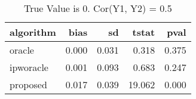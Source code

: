 \begin{table}[h!]

\caption{True Value is 0. Cor(Y1, Y2) = 0.5}
\centering
\begin{tabular}[t]{lrrrr}
\toprule
algorithm & bias & sd & tstat & pval\\
\midrule
oracle & 0.000 & 0.031 & 0.318 & 0.375\\
ipworacle & 0.001 & 0.093 & 0.683 & 0.247\\
proposed & 0.017 & 0.039 & 19.062 & 0.000\\
\bottomrule
\end{tabular}
\end{table}
